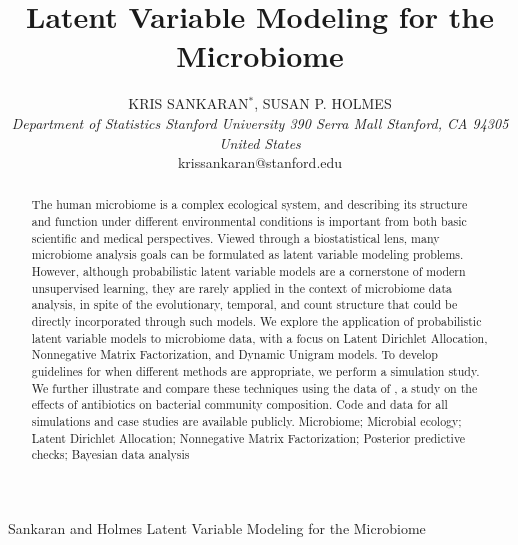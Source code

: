 \documentclass[oupdraft]{bio}
\begin{document}
\title{Latent Variable Modeling for the Microbiome}

\author{
  KRIS SANKARAN$^\ast$, SUSAN P. HOLMES\\[4pt]
  \textit{
    Department of Statistics
    Stanford University
    390 Serra Mall
    Stanford, CA 94305
    United States
  } \\[2pt]
  {krissankaran@stanford.edu}
}

\markboth
{Sankaran and Holmes}
{Latent Variable Modeling for the Microbiome}

\maketitle


\begin{abstract}
  {
    The human microbiome is a complex ecological system, and describing its
    structure and function under different environmental conditions is important
    from both basic scientific and medical perspectives. Viewed through a
    biostatistical lens, many microbiome analysis goals can be formulated as
    latent variable modeling problems. However, although probabilistic latent
    variable models are a cornerstone of modern unsupervised learning, they are
    rarely applied in the context of microbiome data analysis, in spite of the
    evolutionary, temporal, and count structure that could be directly
    incorporated through such models. We explore the application of
    probabilistic latent variable models to microbiome data, with a focus on
    Latent Dirichlet Allocation, Nonnegative Matrix Factorization, and Dynamic
    Unigram models. To develop guidelines for when different methods are
    appropriate, we perform a simulation study. We further illustrate and
    compare these techniques using the data of \cite{dethlefsen2011incomplete},
    a study on the effects of antibiotics on bacterial community composition.
    Code and data for all simulations and case studies are available publicly.}
  {
    Microbiome; Microbial ecology; Latent Dirichlet Allocation; Nonnegative
    Matrix Factorization; Posterior predictive checks; Bayesian data analysis
  }
\end{abstract}
\end{document}
